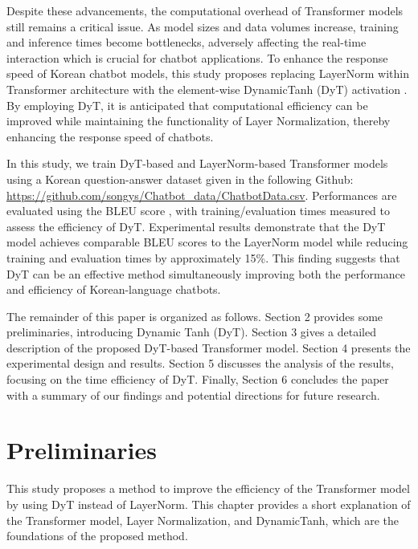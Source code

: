 \documentclass{article}
\begin{document}
Despite these advancements, the computational overhead of Transformer models still remains a critical issue. As model sizes and data volumes increase, training and inference times become bottlenecks, adversely affecting the real-time interaction which is crucial for chatbot applications. To enhance the response speed of Korean chatbot models, this study proposes replacing LayerNorm \cite{ba2016layer} within Transformer architecture with the element-wise DynamicTanh (DyT) activation \cite{zhu2025transformers}. By employing DyT, it is anticipated that computational efficiency can be improved while maintaining the functionality of Layer Normalization, thereby enhancing the response speed of chatbots.

In this study, we train DyT-based and LayerNorm-based Transformer models using a Korean question-answer dataset given in the following Github: \url{https://github.com/songys/Chatbot_data/ChatbotData.csv}. Performances are evaluated using the BLEU score \cite{papineni2002bleu}, with training/evaluation times measured to assess the efficiency of DyT. Experimental results demonstrate that the DyT model achieves comparable BLEU scores to the LayerNorm model while reducing training and evaluation times by approximately 15\%. This finding suggests that DyT can be an effective method simultaneously improving both the performance and efficiency of Korean-language chatbots.

The remainder of this paper is organized as follows. Section 2 provides some preliminaries, introducing Dynamic Tanh (DyT). Section 3 gives a detailed description of the proposed DyT-based Transformer model. Section 4 presents the experimental design and results. Section 5 discusses the analysis of the results, focusing on the time efficiency of DyT. Finally, Section 6 concludes the paper with a summary of our findings and potential directions for future research.

\section{Preliminaries}
This study proposes a method to improve the efficiency of the Transformer model by using DyT instead of LayerNorm. This chapter provides a short explanation of the Transformer model, Layer Normalization, and DynamicTanh, which are the foundations of the proposed method.
\end{document}
